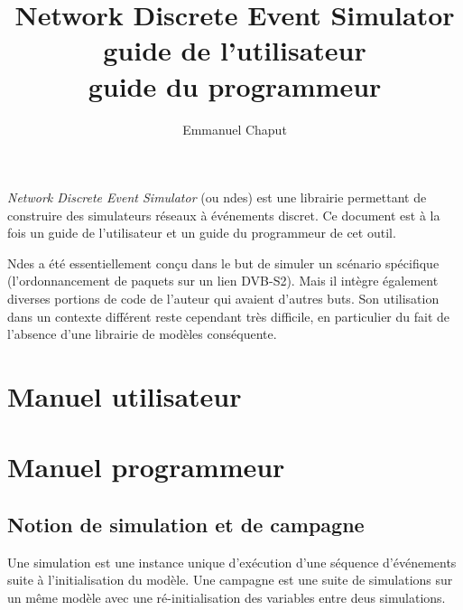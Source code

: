 \documentclass{book}
\title{Network Discrete Event Simulator\\
       guide de l'utilisateur\\
       guide du programmeur}
\author{Emmanuel Chaput}
\begin{document}
\maketitle

   {\em Network Discrete Event Simulator} (ou {\sc ndes}) est une
librairie permettant de construire des simulateurs réseaux à
événements discret. Ce document est à la fois un guide de
l'utilisateur et un guide du programmeur de cet outil.

   {\sc Ndes} a été essentiellement conçu dans le but de simuler un
scénario spécifique (l'ordonnancement de paquets sur un lien
DVB-S2). Mais il intègre également diverses portions de code de
l'auteur qui avaient d'autres buts. Son utilisation dans un contexte
différent reste cependant très difficile, en particulier du fait de
l'absence d'une librairie de modèles conséquente.

\newpage
\tableofcontents
\newpage

%
\chapter{Manuel utilisateur}





%
\chapter{Manuel programmeur}









%
\section{Notion de simulation et de campagne}

   Une simulation est une instance unique d'exécution d'une séquence
d'événements suite à l'initialisation du modèle. Une campagne est une
suite de simulations sur un même modèle avec une ré-initialisation des
variables entre deus simulations.
\end{document}
